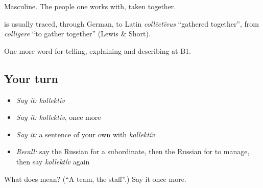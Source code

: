 Masculine. The people one works with, taken together.

\begin{cousinweb}
\textbf{} is usually traced, through German, to Latin \emph{collēctīvus} \textquotedblleft{}gathered together\textquotedblright{}, from \emph{colligere} \textquotedblleft{}to gather together\textquotedblright{} (Lewis \& Short).
\end{cousinweb}

\begin{grammarlens}[title={What you've built}]
One more word for telling, explaining and describing at B1.
\end{grammarlens}

\subsection*{Your turn}
\begin{itemize}
\raggedright
  \item \emph{Say it:} \emph{kollektív}
  \item \emph{Say it:} \emph{kollektív}, once more
  \item \emph{Say it:} a sentence of your own with \emph{kollektív}
  \item \emph{Recall:} say the Russian for a subordinate, then the Russian for to manage, then say \emph{kollektív} again
\end{itemize}

\begin{tcolorbox}[breakable,colback=teal!4,colframe=teal!35!black,title={Before you move on}]
What does  mean? (\textquotedblleft{}A team, the staff\textquotedblright{}.) Say it once more.
\end{tcolorbox}
